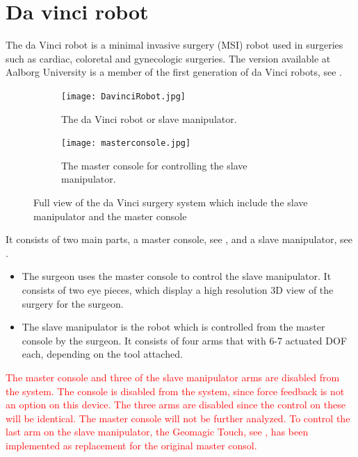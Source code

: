 \section{Da vinci robot}\label{sec:da_vin_rob}

The da Vinci robot is a minimal invasive surgery (MSI) robot used in surgeries such as cardiac, coloretal and gynecologic surgeries\cite{daVinciSurgery}. The version available at Aalborg University is a member of the first generation of da Vinci robots, see .

\begin{figure}[H]
	\centering
	\begin{subfigure}{.45\textwidth}
		\centering
		\texttt{[image: DavinciRobot.jpg]}
		\caption{The da Vinci robot or slave manipulator.}
		\label{fig:davincirobot}
	\end{subfigure}
	\begin{subfigure}{.45\textwidth}
		\centering
		\vspace{12pt}
		\texttt{[image: masterconsole.jpg]}
		\caption{The master console for controlling the slave manipulator.}
		\label{fig:mastermani}
	\end{subfigure}
\caption{Full view of the da Vinci surgery system which include the slave manipulator and the master console}
\label{fig:fulldavinci}
\end{figure}

It consists of two main parts, a master console, see , and a slave manipulator, see .

\begin{itemize}
\item The surgeon uses the master console to control the slave manipulator. It consists of two eye pieces, which display a high resolution 3D view of the surgery for the surgeon. 
\item The slave manipulator is the robot which is controlled from the master console by the surgeon. It consists of four arms that with 6-7 actuated \gls{DOF} each, depending on the tool attached.
\end{itemize}

\textcolor{red}{The master console and three of the slave manipulator arms are disabled from the system. The console is disabled from the system, since force feedback is not an option on this device. The three arms are disabled since the control on these will be identical. The master console will not be further analyzed. To control the last arm on the slave manipulator, the Geomagic Touch, see , has been implemented as replacement for the original master consol.}



